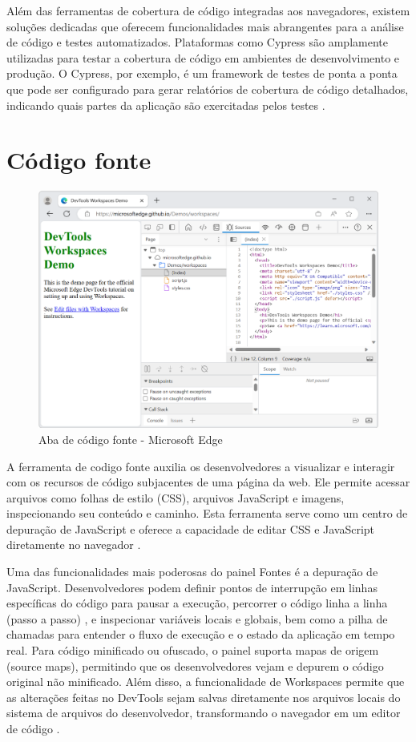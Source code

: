 Além das ferramentas de cobertura de código integradas aos navegadores, existem soluções dedicadas que oferecem funcionalidades mais abrangentes para a análise de código e testes automatizados. Plataformas como Cypress são amplamente utilizadas para testar a cobertura de código em ambientes de desenvolvimento e produção. O Cypress, por exemplo, é um framework de testes de ponta a ponta que pode ser configurado para gerar relatórios de cobertura de código detalhados, indicando quais partes da aplicação são exercitadas pelos testes \cite{cypress}. 

\section{Código fonte}
\begin{figure}[h!]
    \centering
    \includegraphics[width=0.7\linewidth]{assets/tools/edge-sources.png}
    \caption{Aba de código fonte - Microsoft Edge }
    \label{fig:enter-label}
\end{figure}
A ferramenta de codigo fonte auxilia os desenvolvedores a visualizar e interagir com os recursos de código subjacentes de uma página da web. Ele permite acessar arquivos como folhas de estilo (CSS), arquivos JavaScript e imagens, inspecionando seu conteúdo e caminho. Esta ferramenta serve como um centro de depuração de JavaScript e oferece a capacidade de editar CSS e JavaScript diretamente no navegador \cite{chrome}.

Uma das funcionalidades mais poderosas do painel Fontes é a depuração de JavaScript. Desenvolvedores podem definir pontos de interrupção em linhas específicas do código para pausar a execução, percorrer o código linha a linha (passo a passo) \cite{apple}, e inspecionar variáveis locais e globais, bem como a pilha de chamadas para entender o fluxo de execução e o estado da aplicação em tempo real. Para código minificado ou ofuscado, o painel suporta mapas de origem (source maps), permitindo que os desenvolvedores vejam e depurem o código original não minificado. Além disso, a funcionalidade de Workspaces permite que as alterações feitas no DevTools sejam salvas diretamente nos arquivos locais do sistema de arquivos do desenvolvedor, transformando o navegador em um editor de código \cite{edge}.


